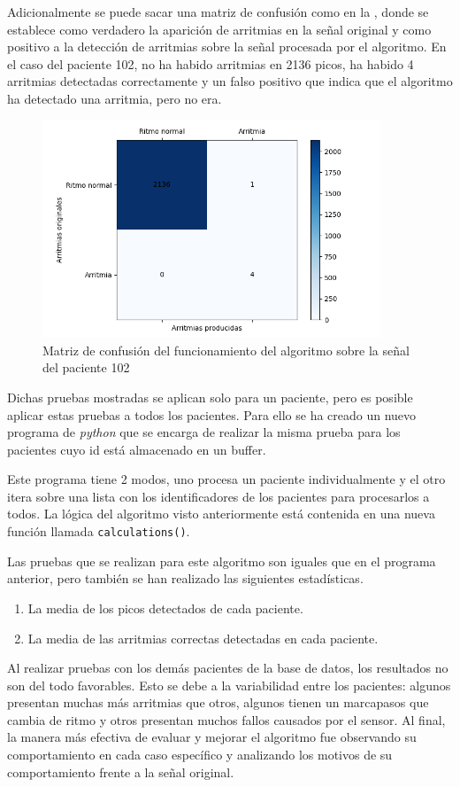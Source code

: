 Adicionalmente se puede sacar una matriz de confusión como en la , donde se establece como verdadero la aparición de arritmias en la señal original y como positivo a la detección de arritmias sobre la señal procesada por el algoritmo. En el caso del paciente 102, no ha habido arritmias en 2136 picos, ha habido 4 arritmias detectadas correctamente y un falso positivo que indica que el algoritmo ha detectado una arritmia, pero no era.

\begin{figure}[h!]
	\centering
    \includegraphics[width=0.9\textwidth]{./Images/img_algoritmo/matrizdeconfusion.png}
    \caption[Matriz de confusión]{Matriz de confusión del funcionamiento del algoritmo sobre la señal del paciente 102}
    \label{fig:matrizdeconfusion}
\end{figure} 

Dichas pruebas mostradas se aplican solo para un paciente, pero es posible aplicar estas pruebas a todos los pacientes.
Para ello se ha creado un nuevo programa de \textit{python} que se encarga de realizar la misma prueba para los pacientes cuyo id está
almacenado en un buffer.

Este programa tiene 2 modos, uno procesa un paciente individualmente y el otro itera sobre una lista con los identificadores de los pacientes para procesarlos a todos. La lógica del algoritmo visto anteriormente está contenida en una nueva función llamada \lstinline{calculations()}.

Las pruebas que se realizan para este algoritmo son iguales que en el programa anterior, pero también
se han realizado las siguientes estadísticas.

\begin{enumerate}
	\item La media de los picos detectados de cada paciente.
	\item La media de las arritmias correctas detectadas en cada paciente.
\end{enumerate} 

Al realizar pruebas con los demás pacientes de la base de datos, los resultados no son del todo favorables. Esto se debe a la variabilidad entre los pacientes: algunos presentan muchas más arritmias que otros, algunos tienen un marcapasos que cambia de ritmo y otros presentan muchos fallos causados por el sensor. Al final, la manera más efectiva de evaluar y mejorar el algoritmo fue observando su comportamiento en cada caso específico y analizando los motivos de su comportamiento frente a la señal original.
